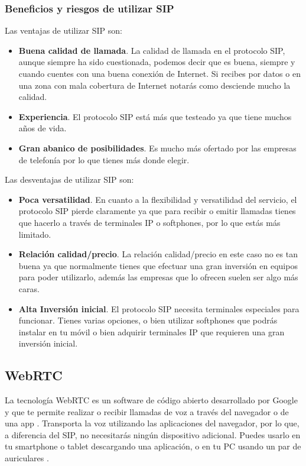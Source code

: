 \subsubsection{Beneficios y riesgos de utilizar SIP}

Las ventajas de utilizar SIP son:

\begin{itemize}
  \item \textbf{Buena calidad de llamada}. La calidad de llamada en el protocolo SIP, aunque siempre ha sido cuestionada, podemos decir que es buena, siempre y cuando cuentes con una buena conexión de Internet. Si recibes por datos o en una zona con mala cobertura de Internet notarás como desciende mucho la calidad.
  \item \textbf{Experiencia}. El protocolo SIP está más que testeado ya que tiene muchos años de vida.
  \item \textbf{Gran abanico de posibilidades}. Es mucho más ofertado por las empresas de telefonía por lo que tienes más donde elegir.
\end{itemize}

Las desventajas de utilizar SIP son:

\begin{itemize}
  \item \textbf{Poca versatilidad}. En cuanto a la flexibilidad y versatilidad del servicio, el protocolo SIP pierde claramente ya que para recibir o emitir llamadas tienes que hacerlo a través de terminales IP o softphones, por lo que estás más limitado.
  \item \textbf{Relación calidad/precio}. La relación calidad/precio en este caso no es tan buena ya que normalmente tienes que efectuar una gran inversión en equipos para poder utilizarlo, además las empresas que lo ofrecen suelen ser algo más caras.
  \item \textbf{Alta Inversión inicial}. El protocolo SIP necesita terminales especiales para funcionar. Tienes varias opciones, o bien utilizar softphones que podrás instalar en tu móvil o bien adquirir terminales IP que requieren una gran inversión inicial.
\end{itemize}

\subsection{WebRTC}

La tecnología WebRTC es un software de código abierto desarrollado por Google y que te permite realizar o recibir llamadas de voz a través del navegador o de una app \cite{webrtc1}. Transporta la voz utilizando las aplicaciones del navegador, por lo que, a diferencia del SIP, no necesitarás ningún dispositivo adicional. Puedes usarlo en tu smartphone o tablet descargando una aplicación, o en tu PC usando un par de auriculares \cite{webrtc2}.

